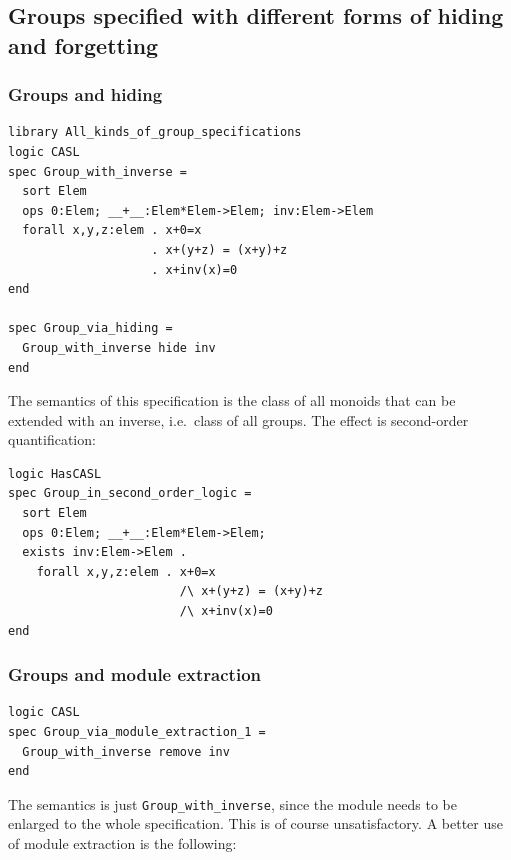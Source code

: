 \documentclass[10pt,fleqn,%
\ifpretendfinal
final%
\else
draft%
\fi,
]{scrreprt}
\newcommand*{\syntax}[1]{\texttt{#1}}
\newcommand{\ssclause}[1]{\subsection{#1}}
\newcommand{\sssclause}[1]{\subsubsection{#1}}
\begin{document}
\ssclause{Groups specified with different forms of hiding and forgetting}

\sssclause{Groups and hiding}
\begin{lstlisting}[basicstyle=\ttfamily,language=dolText,morekeywords={props,ObjectProperty,Class,DisjointUnionOf,SubClassOf,Characteristics,Transitive,Asymmetric,SubPropertyOf,DisjointClasses,EquivalentTo,inverse,only,forall,iff,if,or,exists,sort,ops,spec},escapechar=@,mathescape]
library All_kinds_of_group_specifications
logic CASL
spec Group_with_inverse =
  sort Elem
  ops 0:Elem; __+__:Elem*Elem->Elem; inv:Elem->Elem
  forall x,y,z:elem . x+0=x
                    . x+(y+z) = (x+y)+z
                    . x+inv(x)=0
end

spec Group_via_hiding =
  Group_with_inverse hide inv
end
\end{lstlisting}

The semantics of this specification is the class of all monoids that
can be extended with an inverse, i.e.\ class of all groups. The effect
is second-order quantification:

\begin{lstlisting}[basicstyle=\ttfamily,language=dolText,morekeywords={props,ObjectProperty,Class,DisjointUnionOf,SubClassOf,Characteristics,Transitive,Asymmetric,SubPropertyOf,DisjointClasses,EquivalentTo,inverse,only,forall,iff,if,or,exists,sort,ops,spec},escapechar=@,mathescape]
logic HasCASL
spec Group_in_second_order_logic =
  sort Elem
  ops 0:Elem; __+__:Elem*Elem->Elem; 
  exists inv:Elem->Elem .
    forall x,y,z:elem . x+0=x
                        /\ x+(y+z) = (x+y)+z
                        /\ x+inv(x)=0
end
\end{lstlisting}

\sssclause{Groups and module extraction}

\begin{lstlisting}[basicstyle=\ttfamily,language=dolText,morekeywords={props,ObjectProperty,Class,DisjointUnionOf,SubClassOf,Characteristics,Transitive,Asymmetric,SubPropertyOf,DisjointClasses,EquivalentTo,inverse,only,forall,iff,if,or,exists,sort,ops,spec,forget},escapechar=@,mathescape]
logic CASL
spec Group_via_module_extraction_1 =
  Group_with_inverse remove inv
end
\end{lstlisting}
The semantics is just \syntax{Group\_with\_inverse},
since the module needs to be enlarged to the whole specification.
This is of course unsatisfactory. A better use of module extraction
is the following:
\end{document}
